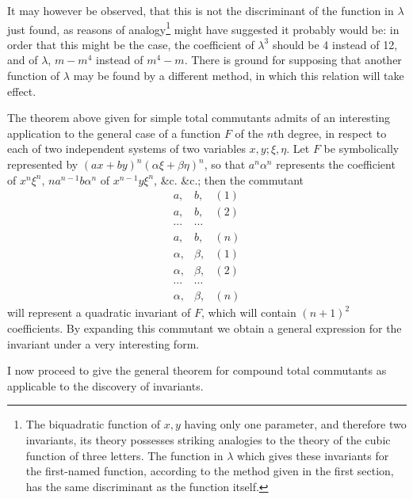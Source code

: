 \documentclass[11pt]{article}
\newcommand{\sourcepage}[1]{\marginpar{\scriptsize p.~#1}}
\begin{document}
{{It may however be observed, that this is not the discriminant of the function in $\lambda$ just found, as reasons of analogy\footnote{The biquadratic function of $x,y$ having only one parameter, and therefore two invariants, its theory possesses striking analogies to the theory of the cubic function of three letters. The function in $\lambda$ which gives these invariants for the first-named function, according to the method given in the first section, has the same discriminant as the function itself.} might have suggested it probably would be: in order that this might be the case, the coefficient of $\lambda^3$ should be 4 instead of 12, and of $\lambda$, $m-m^4$ instead of $m^4-m$. There is ground for supposing that another function of $\lambda$ may be found by a different method, in which this relation will take effect.

The theorem above given for simple total commutants admits of an interesting application to the general case of a function $F$ of the $n$th degree, in respect to each of two independent systems of two variables $x,y;\xi,\eta$. Let $F$ be symbolically represented by $(ax+by)^n(\alpha\xi+\beta\eta)^n$, so that $a^n\alpha^n$ represents the coefficient of $x^n\xi^n$, $na^{n-1}b\alpha^n$ of $x^{n-1}y\xi^n$, \&c. \&c.; then the commutant
\[
\begin{array}{ccr}
a,&b,&(1)\\
a,&b,&(2)\\
\cdots&\cdots&\\
a,&b,&(n)\\
\alpha,&\beta,&(1)\\
\alpha,&\beta,&(2)\\
\cdots&\cdots&\\
\alpha,&\beta,&(n)
\end{array}
\]
will represent a quadratic invariant of $F$, which will contain $(n+1)^2$ coefficients. By expanding this commutant we obtain a general expression for the invariant under a very interesting form.

\sourcepage{312}
I now proceed to give the general theorem for compound total commutants as applicable to the discovery of invariants.

}}
\end{document}
